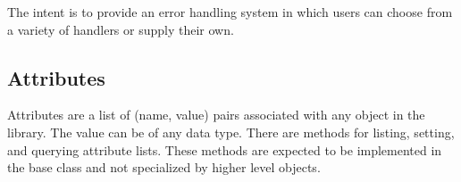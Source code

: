The intent is to provide an error handling system in which
users can choose from a variety of handlers or supply their own.


\subsection{Attributes}

Attributes are a list of (name, value) pairs associated with any 
object in the library. The value can be of any data type. 
There are methods for listing, setting, and querying attribute lists.
These methods are expected to be implemented in the base class
and not specialized by higher level objects.








